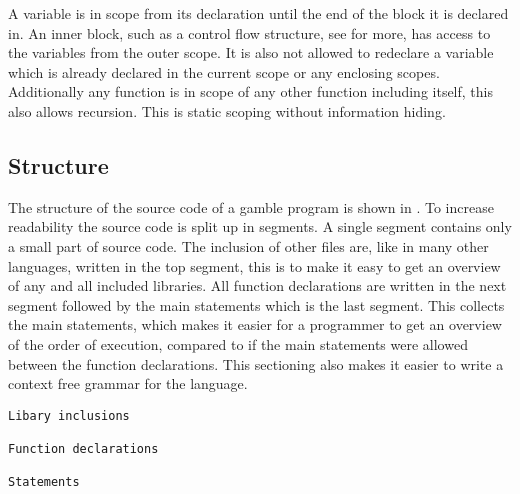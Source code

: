 A variable is in scope from its declaration until the end of the block it is declared in.
An inner block, such as a control flow structure, see  for more, has access to the variables from the outer scope. 
It is also not allowed to redeclare a variable which is already declared in the current scope or any enclosing scopes. 
Additionally any function is in scope of any other function including itself, this also allows recursion. 
This is static scoping without information hiding. 

\subsection*{Structure}\label{subsec:Struc}
The structure of the source code of a \gls{gamble} program is shown in .
To increase readability the source code is split up in segments.
A single segment contains only a small part of source code.
The inclusion of other files are, like in many other languages, written in the top segment, this is to make it easy to get an overview of any and all included libraries. 
All function declarations are written in the next segment followed by the main statements which is the last segment.
This collects the main statements, which makes it easier for a programmer to get an overview of the order of execution, compared to if the main statements were allowed between the function declarations.
This sectioning also makes it easier to write a context free grammar for the language. 

\begin{lstlisting}[caption={Source code file layout in \gls{gamble}},frame=tlrb,label={lst:Structure}, numbers=none]
Libary inclusions

Function declarations

Statements
\end{lstlisting}                           